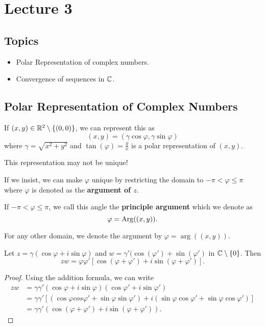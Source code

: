 \documentclass[a4paper]{report}
\begin{document}
\section{Lecture 3}

\subsection{Topics}

\begin{itemize}
    \item Polar Representation of complex numbers.
    \item Convergence of sequences in \( \mathbb{C}  \).
\end{itemize}

\subsection{Polar Representation of Complex Numbers}

If \( (x,y) \in \mathbb{R}^{2} \setminus \{ (0,0) \}  \), we can represent this as  
\[  (x,y) = (\gamma \cos \varphi, \gamma \sin \varphi) \]
where \( \gamma =\sqrt{ x^{2} + y^{2} }   \) and \( \tan(\varphi) = \frac{ y }{ x }  \)
is a polar representation of \( (x,y) \).
\begin{remark}
    This representation may not be unique!
\end{remark}

If we insist, we can make \( \varphi  \) unique by restricting the domain to \( -\pi < \varphi \leq \pi \) where \( \varphi  \) is denoted as the \textbf{argument of \( z  \)}.

\begin{definition}
    If \( - \pi < \varphi \leq \pi \), we call this angle the \textbf{principle argument} which we denote as 
    \[  \varphi = \operatorname{Arg}((x,y)). \]
\end{definition}
\begin{remark}
    For any other domain, we denote the argument by \( \varphi = \arg((x,y)) \).
\end{remark}

\begin{lemma}
    Let \( z = \gamma(\cos \varphi + i \sin \varphi) \) and \( w = \gamma' (\cos(\varphi') + \sin(\varphi') \) in \( \mathbb{C} \setminus  \{ 0  \}  \). Then
    \[  zw = \varphi \varphi' [\cos(\varphi + \varphi') + i \sin(\varphi + \varphi')]. \]
\end{lemma}
\begin{proof}
Using the addition formula, we can write
\begin{align*}
    zw &= \gamma \gamma'  (\cos \varphi + i \sin \varphi)(\cos \varphi' + i \sin \varphi')  \\
       &= \gamma \gamma' [ (\cos \varphi cos \varphi' + \sin \varphi \sin \varphi') + i(\sin \varphi \cos \varphi' + \sin \varphi \cos \varphi') ] \\
       &= \gamma \gamma' (\cos(\varphi + \varphi') + i \sin(\varphi + \varphi')).
\end{align*}
\end{proof}
\end{document}
